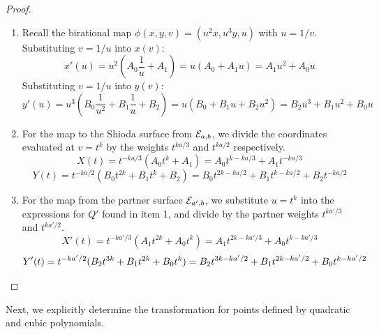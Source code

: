 \documentclass[11pt]{amsart}
\begin{document}
 
\begin{proof}
\begin{enumerate}
	\item[(i)] Recall the birational map $\phi(x,y,v) = (u^2 x, u^3 y, u)$ with $u=1/v$. 
	Substituting $v=1/u$ into $x(v)$:
	\[ x'(u) = u^2 \left( A_0 \frac{1}{u} + A_1 \right) = u(A_0 + A_1 u) = A_1 u^2 + A_0 u \]
	Substituting $v=1/u$ into $y(v)$:
	\[ y'(u) = u^3 \left( B_0 \frac{1}{u^2} + B_1 \frac{1}{u} + B_2 \right) = u(B_0 + B_1 u + B_2 u^2) = B_2 u^3 + B_1 u^2 + B_0 u \]
	
	\item[(ii)] For the map to the Shioda surface from ${\mathcal E}_{a,b}$, we divide the coordinates evaluated at $v=t^k$ by the weights $t^{ka/3}$ and $t^{ka/2}$ respectively.
	\[ X(t) = t^{-ka/3}(A_0 t^k + A_1) = A_0 t^{k - ka/3} + A_1 t^{-ka/3} \]
	\[ Y(t) = t^{-ka/2}(B_0 t^{2k} + B_1 t^k + B_2) = B_0 t^{2k - ka/2} + B_1 t^{k - ka/2} + B_2 t^{-ka/2} \]
	
	\item[(iii)] For the map from the partner surface ${\mathcal E}_{a', b}$, we substitute $u=t^k$ into the expressions for $Q'$ found in item 1, and divide by the partner weights $t^{ka'/3}$ and $t^{ka'/2}$.
	\[ X'(t) = t^{-ka'/3}(A_1 t^{2k} + A_0 t^k) = A_1 t^{2k - ka'/3} + A_0 t^{k - ka'/3} \]
	\[ Y'(t) = t^{-ka'/2}(B_2 t^{3k} + B_1 t^{2k} + B_0 t^k) = B_2 t^{3k - ka'/2} + B_1 t^{2k - ka'/2} + B_0 t^{k - ka'/2} \qedhere \]
		\end{enumerate}
\end{proof}


Next, we explicitly determine the transformation for points defined by quadratic and cubic polynomials.
\end{document}
